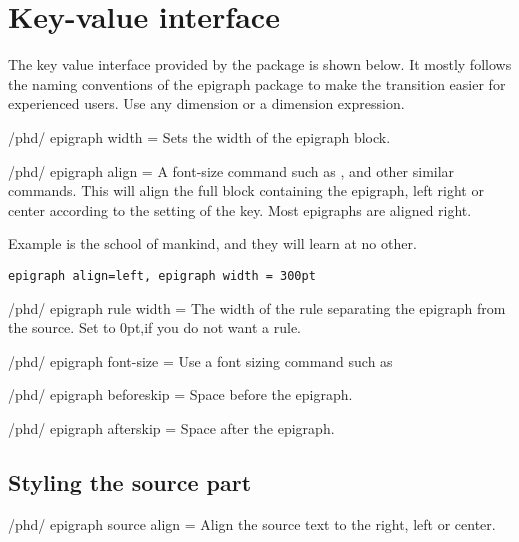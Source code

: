 \section{Key-value interface}
The key value interface provided by the package is shown below. It mostly follows the 
naming conventions of the epigraph package to make the transition easier for experienced users. Use any dimension or a dimension expression.
\medskip

\begin{key}{/phd/ epigraph width = }
  Sets the width of the epigraph block. 
\end{key}


\begin{key}{/phd/ epigraph align = }
 A font-size command such as , 
 and other similar commands. This will align the full block containing the epigraph, left right or center according to the setting of the key. Most epigraphs are aligned right.
\end{key}

\epigraph{Example is the school of mankind, and they
will learn at no other.}{\texttt{epigraph align=left, epigraph width = 300pt}}


\begin{key}{/phd/ epigraph rule width = }
 The width of the rule separating the epigraph from the source. Set to 0pt,if you do not want a rule.
\end{key}

\begin{key}{/phd/ epigraph font-size = }  Use a font sizing command such as \cmd{\footnotesize}
\end{key}

\begin{key}{/phd/ epigraph beforeskip = }
Space before the epigraph.
\end{key}

\begin{key}{/phd/ epigraph afterskip = }
Space after the epigraph.
\end{key}

\subsection{Styling the source part}

\begin{key}{/phd/ epigraph source align = }
Align the source text to the right, left or center.
\end{key}

